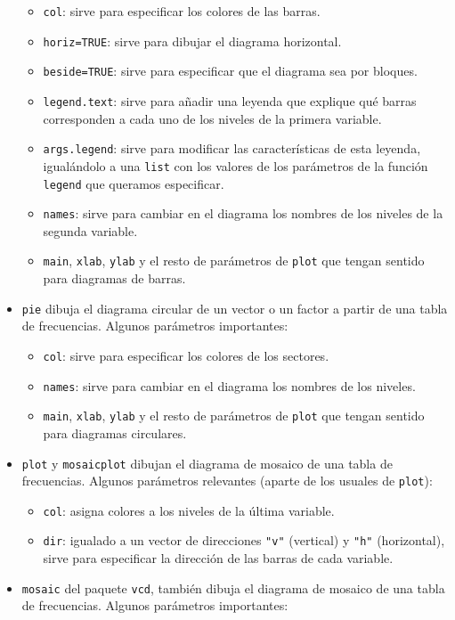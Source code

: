 \documentclass[
]{book}
\providecommand{\tightlist}{%
  \setlength{\itemsep}{0pt}\setlength{\parskip}{0pt}}
\theoremstyle{definition}
\theoremstyle{definition}
\theoremstyle{definition}
\theoremstyle{remark}
\begin{document}
\begin{itemize}
  \begin{itemize}
  \tightlist
  \item
    \texttt{col}: sirve para especificar los colores de las barras.
  \item
    \texttt{horiz=TRUE}: sirve para dibujar el diagrama horizontal.
  \item
    \texttt{beside=TRUE}: sirve para especificar que el diagrama sea por bloques.
  \item
    \texttt{legend.text}: sirve para añadir una leyenda que explique qué barras corresponden a cada uno de los niveles de la primera variable.
  \item
    \texttt{args.legend}: sirve para modificar las características de esta leyenda, igualándolo a una \texttt{list} con los valores de los parámetros de la función \texttt{legend} que queramos especificar.
  \item
    \texttt{names}: sirve para cambiar en el diagrama los nombres de los niveles de la segunda variable.
  \item
    \texttt{main}, \texttt{xlab}, \texttt{ylab} y el resto de parámetros de \texttt{plot} que tengan sentido para diagramas de barras.
  \end{itemize}
\item
  \texttt{pie} dibuja el diagrama circular de un vector o un factor a partir de una tabla de frecuencias. Algunos parámetros importantes:

  \begin{itemize}
  \tightlist
  \item
    \texttt{col}: sirve para especificar los colores de los sectores.
  \item
    \texttt{names}: sirve para cambiar en el diagrama los nombres de los niveles.
  \item
    \texttt{main}, \texttt{xlab}, \texttt{ylab} y el resto de parámetros de \texttt{plot} que tengan sentido para diagramas circulares.
  \end{itemize}
\item
  \texttt{plot} y \texttt{mosaicplot} dibujan el diagrama de mosaico de una tabla de frecuencias. Algunos parámetros relevantes (aparte de los usuales de \texttt{plot}):

  \begin{itemize}
  \tightlist
  \item
    \texttt{col}: asigna colores a los niveles de la última variable.
  \item
    \texttt{dir}: igualado a un vector de direcciones \texttt{"v"} (vertical) y \texttt{"h"} (horizontal), sirve para especificar la dirección de las barras de cada variable.
  \end{itemize}
\item
  \texttt{mosaic} del paquete \texttt{vcd}, también dibuja el diagrama de mosaico de una tabla de frecuencias. Algunos parámetros importantes:


\end{itemize}
\end{document}
